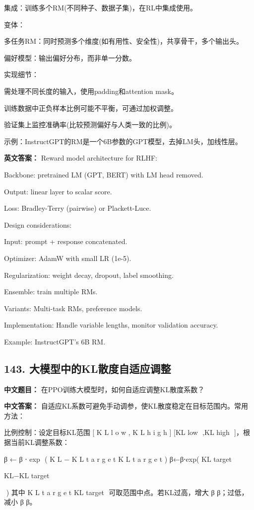 \documentclass[10pt,a4paper]{ctexart}
\begin{document}
集成：训练多个RM(不同种子、数据子集)，在RL中集成使用。

变体：

多任务RM：同时预测多个维度(如有用性、安全性)，共享骨干，多个输出头。

偏好模型：输出偏好分布，而非单一分数。

实现细节：

需处理不同长度的输入，使用padding和attention mask。

训练数据中正负样本比例可能不平衡，可通过加权调整。

验证集上监控准确率(比较预测偏好与人类一致的比例)。

示例：InstructGPT的RM是一个6B参数的GPT模型，去掉LM头，加线性层。

\textbf{英文答案：}
Reward model architecture for RLHF:

Backbone: pretrained LM (GPT, BERT) with LM head removed.

Output: linear layer to scalar score.

Loss: Bradley-Terry (pairwise) or Plackett-Luce.

Design considerations:

Input: prompt + response concatenated.

Optimizer: AdamW with small LR (1e-5).

Regularization: weight decay, dropout, label smoothing.

Ensemble: train multiple RMs.

Variants: Multi-task RMs, preference models.

Implementation: Handle variable lengths, monitor validation accuracy.

Example: InstructGPT's 6B RM.

\subsection*{143. 大模型中的KL散度自适应调整}
\textbf{中文题目：} 在PPO训练大模型时，如何自适应调整KL散度系数？

\textbf{中文答案：}
自适应KL系数可避免手动调参，使KL散度稳定在目标范围内。常用方法：

比例控制：设定目标KL范围 
[
K
L
l
o
w
,
K
L
h
i
g
h
]
[KL 
low
​
 ,KL 
high
​
 ]，根据当前KL调整系数：

β
←
β
⋅
exp
⁡
(
K
L
−
K
L
t
a
r
g
e
t
K
L
t
a
r
g
e
t
)
β←β⋅exp( 
KL 
target
​
 
KL−KL 
target
​
 
​
 )
其中 
K
L
t
a
r
g
e
t
KL 
target
​
  可取范围中点。若KL过高，增大
β
β；过低，减小
β
β。
\end{document}
